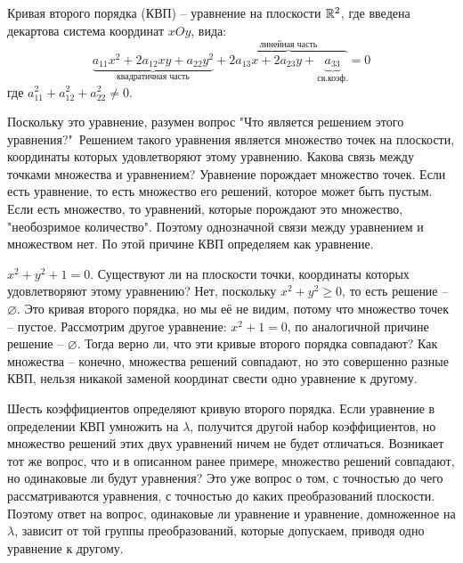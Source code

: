 	\begin{figure*}[h]
		\centering
		\def\svgwidth{0.35\columnwidth}
		
	\end{figure*}



	\begin{Def}
    Кривая второго порядка (КВП) -- уравнение на плоскости $\mathbb{R}^2$, где введена декартова система координат $xOy$, вида: $$\underbrace{a_{11} x^2 + 2 a_{12}xy + a_{22} y^2}_{\text{квадратичная часть}} + \overbrace{2 a_{13}x + 2 a_{23}y + \underbrace{a_{33}}_{\text{св.коэф.}}}^{\text{линейная часть}} = 0$$ 
    где $a_{11}^2 + a_{12}^2 + a_{22}^2 \neq 0$.
  \end{Def}

  Поскольку это уравнение, разумен вопрос "Что является решением этого уравнения?"\ Решением такого уравнения является множество точек на плоскости, координаты которых удовлетворяют этому уравнению.
  Какова связь между точками множества и уравнением? Уравнение порождает множество точек. Если есть уравнение, то есть множество его решений, которое может быть пустым. Если есть множество, то уравнений, которые порождают это множество, "необозримое количество". 
  Поэтому однозначной связи между уравнением и множеством нет. По этой причине КВП определяем как уравнение.

  \begin{Example}
    $x^2 + y^2 + 1 = 0$. Существуют ли на плоскости точки, координаты которых удовлетворяют этому уравнению? Нет, поскольку $x^2 + y^2 \geqslant 0$, то есть решение -- $\varnothing$. Это кривая второго порядка, но мы её не видим, потому что множество точек -- пустое. 
    Рассмотрим другое уравнение: $x^2 + 1 = 0$, по аналогичной причине решение -- $\varnothing$. Тогда верно ли, что эти кривые второго порядка совпадают? Как множества -- конечно, множества решений совпадают, но это совершенно разные КВП, нельзя никакой заменой координат свести одно уравнение к другому.
  \end{Example}

  \begin{Rem}
    Шесть коэффициентов определяют кривую второго порядка. Если уравнение в определении КВП умножить на $\lambda$, получится другой набор коэффициентов, но множество решений этих двух уравнений ничем не будет отличаться.
    Возникает тот же вопрос, что и в описанном ранее примере, множество решений совпадают, но одинаковые ли будут уравнения? Это уже вопрос о том, с точностью до чего рассматриваются уравнения, с точностью до каких преобразований плоскости.
    Поэтому ответ на вопрос, одинаковые ли уравнение и уравнение, домноженное на $\lambda$, зависит от той группы преобразований, которые допускаем, приводя одно уравнение к другому.
  \end{Rem}

